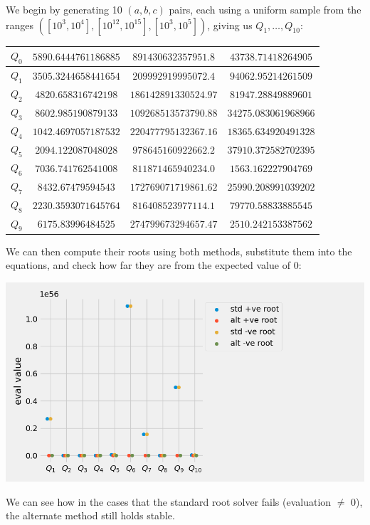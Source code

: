 We begin by generating 10 $(a, b, c)$ pairs, each using a uniform sample from the ranges $([10^3, 10^4], [10^12, 10^15], [10^3, 10^5])$, giving us $Q_1, \dots, Q_{10}$:

\begin{center}
	\begin{tabular}{|c|c|c|c|}
		\hline $Q_0$ & $5890.6444761186885$ & $891430632357951.8$ & $43738.71418264905$\\
		\hline $Q_1$ & $3505.3244658441654$ & $209992919995072.4$ & $94062.95214261509$\\
		\hline $Q_2$ & $4820.658316742198$ & $186142891330524.97$ & $81947.28849889601$\\
		\hline $Q_3$ & $8602.985190879133$ & $109268513573790.88$ & $34275.083061968966$\\
		\hline $Q_4$ & $1042.4697057187532$ & $220477795132367.16$ & $18365.634920491328$\\
		\hline $Q_5$ & $2094.122087048028$ & $978645160922662.2$ & $37910.372582702395$\\
		\hline $Q_6$ & $7036.741762541008$ & $811871465940234.0$ & $1563.162227904769$\\
		\hline $Q_7$ & $8432.67479594543$ & $172769071719861.62$ & $25990.208991039202$\\
		\hline $Q_8$ & $2230.3593071645764$ & $816408523977114.1$ & $79770.58833885545$\\
		\hline $Q_9$ & $6175.83996484525$ & $274799673294657.47$ & $2510.242153387562$\\
		\hline
	\end{tabular}
\end{center}

We can then compute their roots using both methods, substitute them into the equations, and check how far they are from the expected value of $0$:

\begin{center}
	\includegraphics*[width=\textwidth]{res/3.2-compare.png}
\end{center}

We can see how in the cases that the standard root solver fails (evaluation $\ne$ 0), the alternate method still holds stable.